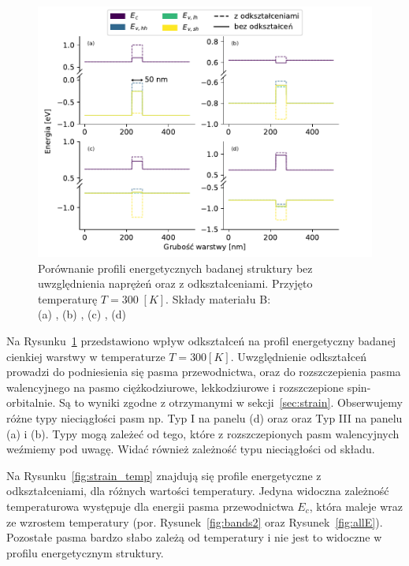 \documentclass[12pt,openany,a4paper]{book}
\begin{document}
\begin{figure}[htbp]
	\centering
	\includegraphics[width = 1\linewidth]{Figures/structure/strain_no_strain.pdf}
	\caption{Porównanie profili energetycznych badanej struktury bez uwzględnienia
	naprężeń oraz z odkształceniami. Przyjęto temperaturę \(T = 300\;[K]\).
	Składy materiału B: \\(a) ,
	(b) , (c) ,
	(d) }\label{fig:strain_no_strain}
\end{figure}

Na Rysunku~\ref{fig:strain_no_strain} przedstawiono wpływ odkształceń na profil energetyczny
badanej cienkiej warstwy w temperaturze \(T = 300[K]\). Uwzględnienie odkształceń prowadzi do podniesienia się pasma przewodnictwa,
oraz do rozszczepienia pasma walencyjnego na pasmo ciężkodziurowe, lekkodziurowe i rozszczepione
spin-orbitalnie. Są to wyniki zgodne z otrzymanymi w sekcji~\ref{sec:strain}.
Obserwujemy różne typy nieciągłości pasm np. Typ I na panelu (d)
oraz oraz Typ III na panelu (a) i (b). Typy mogą zależeć od tego, które z rozszczepionych
pasm walencyjnych weźmiemy pod uwagę. Widać również zależność typu nieciągłości
od składu.

Na Rysunku~\ref{fig:strain_temp} znajdują się profile energetyczne z odkształceniami, dla
różnych wartości temperatury. Jedyna widoczna zależność temperaturowa występuje
dla energii pasma przewodnictwa \(E_c\), która maleje wraz ze wzrostem
temperatury (por. Rysunek~\ref{fig:bands2} oraz Rysunek~\ref{fig:allE}). Pozostałe
pasma bardzo słabo zależą od temperatury i nie jest to widoczne w profilu energetycznym
struktury.
\end{document}
